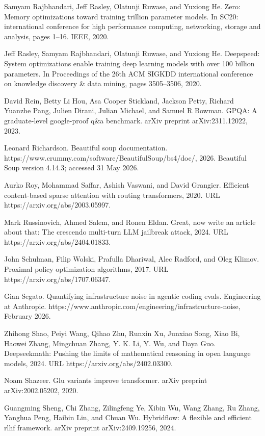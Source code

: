 \documentclass[
  10
]{article}
\begin{document}
Samyam Rajbhandari, Jeff Rasley, Olatunji Ruwase, and Yuxiong He. Zero:
Memory optimizations toward training trillion parameter models. In SC20:
international conference for high performance computing, networking,
storage and analysis, pages 1--16. IEEE, 2020.

Jeff Rasley, Samyam Rajbhandari, Olatunji Ruwase, and Yuxiong He.
Deepspeed: System optimizations enable training deep learning models
with over 100 billion parameters. In Proceedings of the 26th ACM SIGKDD
international conference on knowledge discovery \& data mining, pages
3505--3506, 2020.

David Rein, Betty Li Hou, Asa Cooper Stickland, Jackson Petty, Richard
Yuanzhe Pang, Julien Dirani, Julian Michael, and Samuel R Bowman. GPQA:
A graduate-level google-proof q\&a benchmark. arXiv preprint
arXiv:2311.12022, 2023.

Leonard Richardson. Beautiful soup documentation.
https://www.crummy.com/software/BeautifulSoup/bs4/doc/, 2026. Beautiful
Soup version 4.14.3; accessed 31 May 2026.

Aurko Roy, Mohammad Saffar, Ashish Vaswani, and David Grangier. Efficient
content-based sparse attention with routing transformers, 2020. URL
https://arxiv.org/abs/2003.05997.

Mark Russinovich, Ahmed Salem, and Ronen Eldan. Great, now write an
article about that: The crescendo multi-turn LLM jailbreak attack, 2024.
URL https://arxiv.org/abs/2404.01833.

John Schulman, Filip Wolski, Prafulla Dhariwal, Alec Radford, and Oleg
Klimov. Proximal policy optimization algorithms, 2017. URL
https://arxiv.org/abs/1707.06347.

Gian Segato. Quantifying infrastructure noise in agentic coding evals.
Engineering at Anthropic. https://www.anthropic.com/engineering/infrastructure-noise, February 2026.

Zhihong Shao, Peiyi Wang, Qihao Zhu, Runxin Xu, Junxiao Song, Xiao Bi,
Haowei Zhang, Mingchuan Zhang, Y. K. Li, Y. Wu, and Daya Guo.
Deepseekmath: Pushing the limits of mathematical reasoning in open
language models, 2024. URL https://arxiv.org/abs/2402.03300.

Noam Shazeer. Glu variants improve transformer. arXiv preprint
arXiv:2002.05202, 2020.

Guangming Sheng, Chi Zhang, Zilingfeng Ye, Xibin Wu, Wang Zhang, Ru
Zhang, Yanghua Peng, Haibin Lin, and Chuan Wu. Hybridflow: A flexible
and efficient rlhf framework. arXiv preprint arXiv:2409.19256, 2024.
\end{document}
